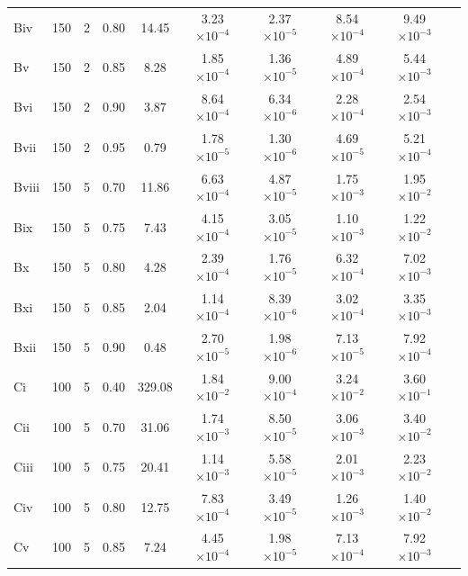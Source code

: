 \begin{table}
\begin{tabular}{l * {9}{c}}
	Biv 	& 150 & 2  &  0.80 & 14.45   & 3.23$\times10^{-4}$   &	2.37$\times10^{-5}$		&	8.54$\times10^{-4}$ 	&  	9.49$\times10^{-3}$	 \\
	Bv 	& 150 & 2  &  0.85 &  8.28  & 1.85$\times10^{-4}$     &     1.36$\times10^{-5}$		&	4.89$\times10^{-4}$		&   	5.44$\times10^{-3}$	 \\
	Bvi 	& 150 & 2  &  0.90 & 3.87  &  8.64$\times10^{-4}$     &	6.34$\times10^{-6}$		&	2.28$\times10^{-4}$		& 	2.54$\times10^{-3}$ 	\\
	Bvii 	& 150 & 2  &  0.95  & 0.79 & 1.78$\times10^{-5}$	&    1.30$\times10^{-6}$		&      4.69$\times10^{-5}$		&      5.21$\times10^{-4}$   \\
 	Bviii    & 150 & 5 & 0.70 & 11.86  & 6.63$\times10^{-4}$      & 	4.87$\times10^{-5}$		& 	1.75$\times10^{-3}$		&      1.95$\times10^{-2}$   \\
	Bix    & 150 & 5 & 0.75 & 7.43   & 4.15$\times10^{-4}$      & 	3.05$\times10^{-5}$		&	1.10$\times10^{-3}$		&	1.22$\times10^{-2}$ \\
	Bx    & 150 & 5  & 0.80  &  4.28 & 2.39$\times10^{-4}$    &    1.76$\times10^{-5}$		&	 6.32$\times10^{-4}$	& 	7.02$\times10^{-3}$  	\\
	Bxi  & 150 & 5  &  0.85 &   2.04  &   1.14$\times10^{-4}$    &	8.39$\times10^{-6}$ 	&  	 3.02$\times10^{-4}$	&  	3.35$\times10^{-3}$ \\
        Bxii   &  150 & 5  &  0.90 &   0.48  &  2.70$\times10^{-5}$   &	1.98$\times10^{-6}$ 	&    	 7.13$\times10^{-5}$	&  	7.92$\times10^{-4}$	 \\
	\hline
        Ci     &  100 & 5  & 0.40    &  329.08  & 1.84$\times10^{-2}$ &   9.00$\times10^{-4}$		&      3.24$\times10^{-2}$		&      3.60$\times10^{-1}$ \\
	Cii	& 100  & 5  & 0.70  & 31.06 & 1.74$\times10^{-3}$	  &   8.50$\times10^{-5}$		&	3.06$\times10^{-3}$		&	3.40$\times10^{-2}$ \\
	Ciii	& 100  & 5  & 0.75  & 20.41 & 1.14$\times10^{-3}$ 	  &   5.58$\times10^{-5}$	 	&      2.01$\times10^{-3}$		&	2.23$\times10^{-2}$ \\
  	Civ    & 100 &  5  & 0.80  & 12.75  &  7.83$\times10^{-4}$  &   3.49$\times10^{-5}$  	&	1.26$\times10^{-3}$ 	&  	1.40$\times10^{-2}$ 	\\
	Cv   & 100 &  5  &  0.85 &   7.24   &  4.45$\times10^{-4}$  &   1.98$\times10^{-5}$ 		&  	7.13$\times10^{-4}$		&      7.92$\times10^{-3}$  \\

\end{tabular}
\end{table}
